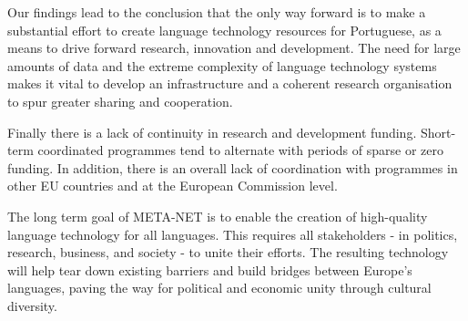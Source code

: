 \begin{multicols}{2}
Our findings lead to the conclusion that the only way forward is to make a substantial effort to create language technology resources for Portuguese, as a means to drive forward research, innovation and development. The need for large amounts of data and the extreme complexity of language technology systems makes it vital to develop an infrastructure and a coherent research organisation to spur greater sharing and cooperation.

Finally there is a lack of continuity in research and development funding. Short-term coordinated programmes tend to alternate with periods of sparse or zero funding. In addition, there is an overall lack of coordination with programmes in other EU countries and at the European Commission level.

The long term goal of META-NET is to enable the creation of high-quality language technology for all languages. This requires all stakeholders - in politics, research, business, and society - to unite their efforts. The resulting technology will help tear down existing barriers and build bridges between Europe’s languages, paving the way for political and economic unity through cultural diversity. 
\end{multicols}

\clearpage


